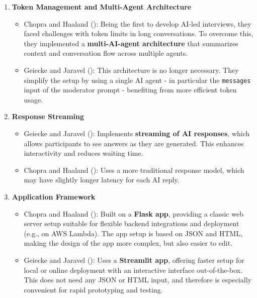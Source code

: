 \documentclass[
  letterpaper,
  DIV=11,
  numbers=noendperiod]{scrartcl}
\providecommand{\tightlist}{%
  \setlength{\itemsep}{0pt}\setlength{\parskip}{0pt}}
\begin{document}
\begin{enumerate}
\def\labelenumi{\arabic{enumi}.}
\tightlist
\item
  \textbf{Token Management and Multi-Agent Architecture}

  \begin{itemize}
  \tightlist
  \item
    Chopra and Haaland (): Being
    the first to develop AI-led interviews, they faced challenges with
    token limits in long conversations. To overcome this, they
    implemented a \textbf{multi-AI-agent architecture} that summarizes
    context and conversation flow across multiple agents.\\
  \item
    Geiecke and Jaravel ():
    This architecture is no longer necessary. They simplify the setup by
    using a single AI agent - in particular the \texttt{messages} input
    of the moderator prompt - benefiting from more efficient token
    usage.
  \end{itemize}
\item
  \textbf{Response Streaming}

  \begin{itemize}
  \tightlist
  \item
    Geiecke and Jaravel ():
    Implements \textbf{streaming of AI responses}, which allows
    participants to see answers as they are generated. This enhances
    interactivity and reduces waiting time.\\
  \item
    Chopra and Haaland (): Uses
    a more traditional response model, which may have slightly longer
    latency for each AI reply.
  \end{itemize}
\item
  \textbf{Application Framework}

  \begin{itemize}
  \tightlist
  \item
    Chopra and Haaland (): Built
    on a \textbf{Flask app}, providing a classic web server setup
    suitable for flexible backend integrations and deployment (e.g., on
    AWS Lambda). The app setup is based on JSON and HTML, making the
    design of the app more complex, but also easier to edit.
  \item
    Geiecke and Jaravel ():
    Uses a \textbf{Streamlit app}, offering faster setup for local or
    online deployment with an interactive interface out-of-the-box. This
    does not need any JSON or HTML input, and therefore is especially
    convenient for rapid prototyping and testing.
  \end{itemize}
\end{enumerate}
\end{document}
